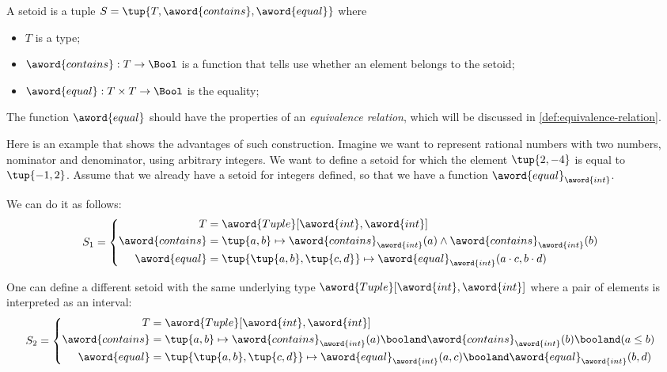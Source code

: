 \begin{ctdefinition}[Setoid]
	A setoid is a tuple $S = \tup{T, \aword{contains}, \aword{equal}}$ where
	\begin{itemize}
		\item $T$ is a type;
		\item $\aword{contains}:T\to\Bool$ is a function that tells use whether an element belongs to the setoid;
		\item $\aword{equal}:T\times T\to\Bool$ is the equality;
	\end{itemize}
\end{ctdefinition}
The function $\aword{equal}$ should have the properties of an \emph{equivalence relation},
which will be discussed in \cref{def:equivalence-relation}.

Here is an example that shows the advantages of such construction.
Imagine we want to represent rational numbers with two numbers, nominator and denominator, using arbitrary integers.
We want to define a setoid for which the element $\tup{2, -4}$ is equal to $\tup{-1, 2}$.
Assume that we already have a setoid for integers defined, so that we have a function $\aword{equal}_{\aword{int}}$.

We can do it as follows:
\begin{equation}
	S_1 =
	\begin{cases}
		\begin{aligned}
			T                & =
			\aword{Tuple}[\aword{int}, \aword{int}]
			\\
			\aword{contains} & = \tup{a,b} \mapsto \aword{contains}_{\aword{int}}(a)  \wedge \aword{contains}_{\aword{int}}(b)
			\\
			\aword{equal}    & = \tup{\tup{a,b}, \tup{c,d}}
			\mapsto \aword{equal}_{\aword{int}} (a\cdot c, b\cdot d)
		\end{aligned}
	\end{cases}
\end{equation}

One can define a different setoid with the same underlying type $\aword{Tuple}[\aword{int}, \aword{int}]$ where a pair of elements is interpreted as an interval:
\begin{equation}
	S_2 =
	\begin{cases}
		\begin{aligned}
			T                & = \aword{Tuple}[\aword{int}, \aword{int}] \\
			\aword{contains} & = \tup{a,b} \mapsto
			\aword{contains}_{\aword{int}}(a)
			\booland
			\aword{contains}_{\aword{int}}(b)
			\booland
			(a\leq b)                                                    \\
			\aword{equal}    & = \tup{\tup{a,b}, \tup{c,d}}
			\mapsto
			\aword{equal}_{\aword{int}}(a,c)
			\booland
			\aword{equal}_{\aword{int}}(b,d)
		\end{aligned}
	\end{cases}
\end{equation}

